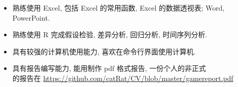 \begin{itemize}
\item 熟练使用 Excel, 包括 Excel 的常用函数, Excel 的数据透视表; Word, PowerPoint.
\item 熟练使用 R 完成假设检验, 差异分析, 回归分析, 时间序列分析.
\item 具有较强的计算机使用能力, 喜欢在命令行界面使用计算机.
\item 具有报告编写能力, 能用制作 pdf 格式报告, 一份个人的非正式 \\
的报告在 \url{https://github.com/catRat/CV/blob/master/gamereport.pdf}
\end{itemize}
